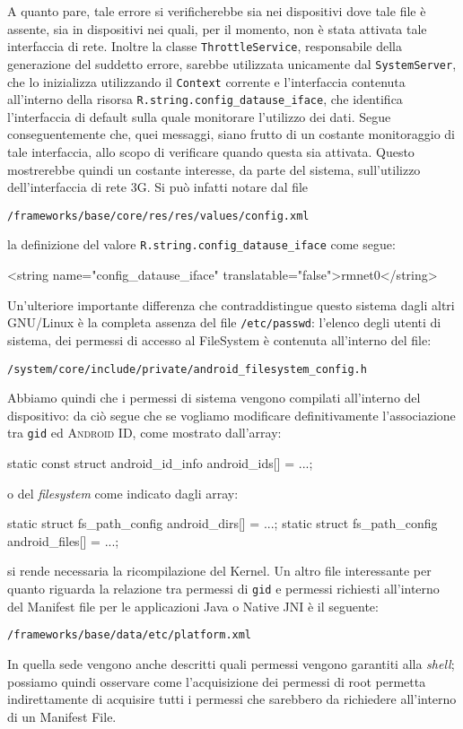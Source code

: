  A quanto pare, tale errore si verificherebbe sia nei dispositivi dove tale
 file è assente, sia in dispositivi nei quali, per il momento, non è stata
 attivata tale interfaccia di rete. Inoltre la classe \texttt{\small ThrottleService},
 responsabile della generazione del suddetto errore, sarebbe utilizzata unicamente
 dal \texttt{\small SystemServer}, che lo inizializza utilizzando il \texttt{\small Context}
 corrente e l'interfaccia contenuta all'interno della risorsa \texttt{\small R.string.config\_datause\_iface},
 che identifica l'interfaccia di default sulla quale monitorare l'utilizzo dei
 dati. Segue conseguentemente che, quei messaggi, siano frutto di un costante 
 monitoraggio di tale interfaccia, allo scopo di verificare quando questa sia
attivata. Questo mostrerebbe quindi un costante interesse, da parte 
 del sistema, sull'utilizzo dell'interfaccia di rete 3G. Si può infatti notare
 dal file
\begin{center}
\AOSP\texttt{\small/frameworks/base/core/res/res/values/config.xml}
\end{center}
 la definizione del valore \texttt{\small R.string.config\_datause\_iface} come segue:
 \begin{xml}
 <string name="config_datause_iface" translatable="false">rmnet0</string>
 \end{xml}

Un'ulteriore importante differenza che contraddistingue questo sistema dagli altri
GNU/Linux è la completa assenza del file \texttt{\small /etc/passwd}: l'elenco degli
utenti di sistema, dei permessi di accesso al FileSystem è contenuta all'interno
del file:
\begin{center}
\AOSP\texttt{\small/system/core/include/private/android\_filesystem\_config.h}
\end{center}
Abbiamo quindi che i permessi di sistema vengono compilati all'interno del dispositivo:
da ciò segue che se vogliamo modificare definitivamente l'associazione tra \texttt{\small gid}
ed \textsc{Android ID}, come mostrato dall'array:
\begin{clang}
static const struct android_id_info android_ids[] = {...};
\end{clang}
o del \textit{filesystem} come indicato dagli array:
\begin{clang}
static struct fs_path_config android_dirs[] = {...};
static struct fs_path_config android_files[] = {...};
\end{clang}
si rende necessaria la ricompilazione del Kernel. Un altro file interessante per
quanto riguarda la relazione tra permessi di \texttt{\small gid} e permessi richiesti
all'interno del Manifest file per le applicazioni Java o Native JNI è il seguente:
\begin{center}
\AOSP\texttt{\small/frameworks/base/data/etc/platform.xml}
\end{center}
In quella sede vengono anche descritti quali permessi vengono garantiti alla \textit{shell};
possiamo quindi osservare come l'acquisizione dei permessi di root permetta
indirettamente di acquisire tutti i permessi che sarebbero da richiedere all'interno
di un Manifest File.


